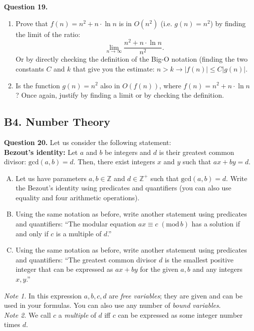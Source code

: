 \documentclass[jou]{apa6}
\begin{document}
\vspace{6pt}
{\bf Question 19.} 
\begin{enumerate}
\item 
Prove that $f(n) = n^2 + n \cdot \ln n$ is in $O(n^2)$ (i.e. $g(n) = n^2$) by finding the limit
of the ratio:
$$\lim_{n \rightarrow \infty} \frac{n^2 + n \cdot \ln n}{n^2}.$$
Or by directly checking the definition of the Big-O notation (finding the two 
constants $C$ and $k$ that give you the estimate: 
$n>k \rightarrow |f(n)| \leq C|g(n)|$.
\item Is the function $g(n) = n^2$ also in $O(f(n))$, where $f(n) = n^2 + n \cdot \ln n$? 
Once again, justify by finding a limit or by checking the definition.
\end{enumerate}





\subsection{B4. Number Theory} 


{\bf Question 20.} Let us consider the following statement:\\

{\bf Bezout's identity:} 
Let $a$ and $b$ be integers and $d$ is their greatest common divisor: $\text{gcd}(a,b)=d$. 
Then, there exist integers $x$ and $y$ such that $ax + by = d$.\\

\begin{enumerate}[(A)] 
\item Let us have parameters $a,b \in \mathbb{Z}$ and $d \in \mathbb{Z}^{+}$ such that $\text{gcd}(a,b)=d$. 
Write the Bezout's identity using predicates and quantifiers (you can also 
use equality and four arithmetic operations). 
\item Using the same notation as before, write another statement using predicates and quantifiers: 
``The modular equation $ax\equiv{}c\;(\text{mod}\,b)$ has a solution if and only if 
$c$ is a multiple of $d$.''
\item Using the same notation as before, write another statement using predicates and quantifiers: 
``The greatest common divisor $d$ is the smallest positive integer that can be expressed as $ax+by$ for 
the given $a,b$ and any integers $x,y$.''
\end{enumerate}

{\em Note 1.} In this expression $a,b,c,d$ are {\em free variables}; they are given and can be used in your formulas. 
You can also use any number of {\em bound variables}.\\
{\em Note 2.} We call $c$ a {\em multiple} of $d$ iff $c$ can be expressed as some integer number times $d$.
\end{document}
